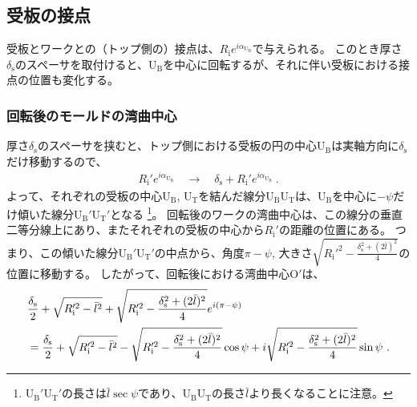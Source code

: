 \subsection{受板の接点}
受板とワークとの（トップ側の）接点は、$R_\mathrm ie^{i\alpha_{\mathrm U_\mathrm B}}$で与えられる。
このとき厚さ$\delta_\mathrm s$のスペーサを取付けると、U$_\mathrm B$を中心に回転するが、それに伴い受板における接点の位置も変化する。


\subsubsection{回転後のモールドの湾曲中心}
厚さ$\delta_\mathrm s$のスペーサを挟むと、トップ側における受板の円の中心U$_\mathrm B$は実軸方向に$\delta_\mathrm s$だけ移動するので、
\begin{align*}
  R_\mathrm i'e^{i\alpha_{\mathrm U_\mathrm B}}
  \quad\longrightarrow\quad
  \delta_\mathrm s+R_\mathrm i'e^{i\alpha_{\mathrm U_\mathrm B}}\ .
\end{align*}
よって、それぞれの受板の中心U$_\mathrm B$, U$_\mathrm T$を結んだ線分U$_\mathrm B$U$_\mathrm T$は、U$_\mathrm B$を中心に$-\psi$だけ傾いた線分U$_\mathrm B'$U$_\mathrm T'$となる
\footnote{%
U$_\mathrm B'$U$_\mathrm T'$の長さは$\bar l\sec\psi$であり、U$_\mathrm B$U$_\mathrm T$の長さ$\bar l$より長くなることに注意。}。
回転後のワークの湾曲中心は、この線分の垂直二等分線上にあり、またそれぞれの受板の中心から$R_\mathrm i'$の距離の位置にある。
つまり、この傾いた線分U$_\mathrm B'$U$_\mathrm T'$の中点から、角度$\pi-\psi$, 大きさ$\sqrt{R_\mathrm i'^2-\frac{\delta_\mathrm s^2+(2\bar l)^2}4}$の位置に移動する。
したがって、回転後における湾曲中心O$'$は、
\begin{align}
  \notag
  & \frac{\delta_\mathrm s}2+\sqrt{R_\mathrm i'^2-\bar l^2}
    +\sqrt{R_\mathrm i'^2-\frac{\delta_\mathrm s^2+(2\bar l)^2}4}e^{i(\pi-\psi)}\\
  & = \frac{\delta_\mathrm s}2+\sqrt{R_\mathrm i'^2-\bar l^2}-\sqrt{R_\mathrm i'^2-\frac{\delta_\mathrm s^2+(2\bar l)^2}4}\cos\psi
      +i\sqrt{R_\mathrm i'^2-\frac{\delta_\mathrm s^2+(2\bar l)^2}4}\sin\psi\ .
    \label{eq:afterOrgin}
\end{align}



